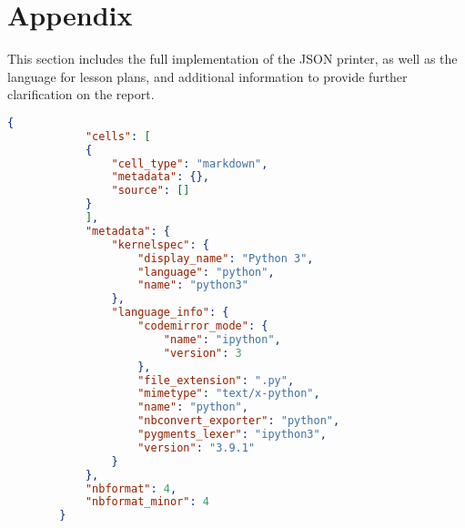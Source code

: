 \appendix
\chapter{Appendix}
This section includes the full implementation of the JSON printer, as well as 
the language for lesson plans, and additional information to provide further 
clarification on the report.

\newpage

\label{appendix_a}
	\begin{lstlisting}[language=json, 
	basicstyle=\linespread{1.1}\small\ttfamily] 
		{
			"cells": [
			{
				"cell_type": "markdown",
				"metadata": {},
				"source": []
			}
			],
			"metadata": {
				"kernelspec": {
					"display_name": "Python 3",
					"language": "python",
					"name": "python3"
				},
				"language_info": {
					"codemirror_mode": {
						"name": "ipython",
						"version": 3
					},
					"file_extension": ".py",
					"mimetype": "text/x-python",
					"name": "python",
					"nbconvert_exporter": "python",
					"pygments_lexer": "ipython3",
					"version": "3.9.1"
				}
			},
			"nbformat": 4,
			"nbformat_minor": 4
		}	
	\end{lstlisting}

\newpage

